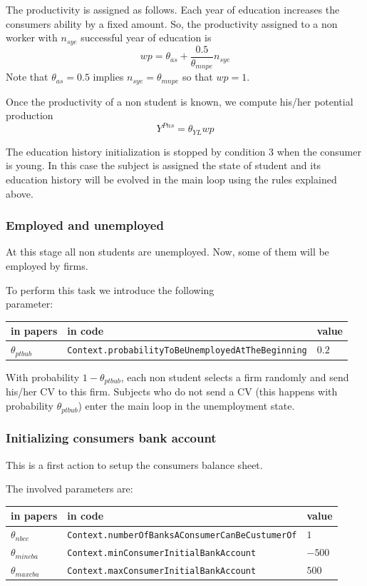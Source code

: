\documentclass{book}
\begin{document}
The productivity is assigned as follows. Each year of education increases the consumers ability by a fixed amount. So, the productivity assigned to a non worker with  $n_{sye}$ successful year of education is
\[
	wp=\theta_{as}+\frac{0.5}{\theta_{mnpe}}n_{sye}
\]
Note that $\theta_{as}=0.5$ implies $n_{sye}=\theta_{mnpe}$ so that $wp=1$.

Once the productivity of a non student is known, we compute his/her potential production 
\[Y^{Pns}=\theta_{YL}wp\]

The education history initialization is stopped by condition 3 when the consumer is young. In this case the subject is assigned the state of student and its education history will be evolved in the main loop using the rules explained above.

\subsubsection*{Employed and unemployed}

At this stage all non students are unemployed. Now, some of them will be employed by firms. 

To perform this task we introduce the following\\
parameter:\\
\begin{tabular}{l l l}
	\hline
	in papers& in code&value\\
	\hline
	\hline
 $\theta_{ptbub}$&\verb+Context.probabilityToBeUnemployedAtTheBeginning+&$0.2$\\
	\hline
\end{tabular}

\vskip5mm
With probability $1-\theta_{ptbub}$, each non student selects a firm randomly and send his/her CV to this firm. Subjects who do not send a CV (this happens with probability $\theta_{ptbub}$) enter the main loop in the unemployment state. 

\subsubsection{Initializing consumers bank account}

This is a first action to setup the consumers balance sheet. 

The involved parameters are:\\
\begin{tabular}{l l l}
	\hline
	in papers& in code&value\\
	\hline
	\hline
 $\theta_{nbcc}$&\verb+Context.numberOfBanksAConsumerCanBeCustumerOf+&$1$\\
 $\theta_{mincba}$&\verb+Context.minConsumerInitialBankAccount+&$-500$\\
 $\theta_{maxcba}$&\verb+Context.maxConsumerInitialBankAccount+&$500$\\
	\hline
\end{tabular}
\end{document}
